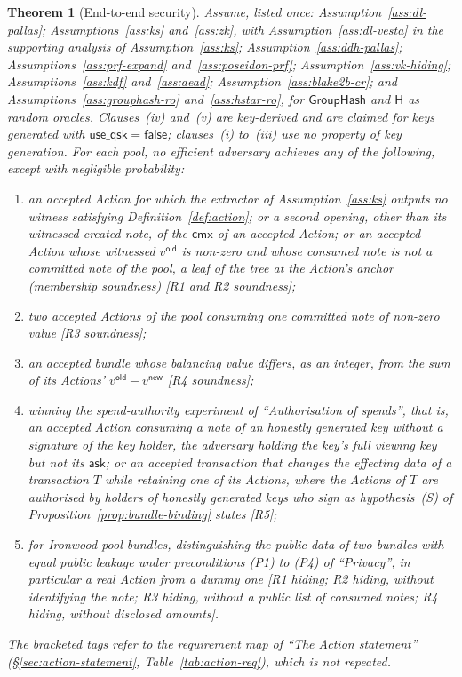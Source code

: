 \documentclass[11pt,a4paper]{article}
\newtheorem{theorem}{Theorem}[section]
\theoremstyle{definition}
\newcommand{\cmx}{\mathsf{cmx}}
\newcommand{\GroupHash}{\ensuremath{\mathsf{GroupHash}}}
\newcommand{\ask}{\ensuremath{\mathsf{ask}}}
\begin{document}
\begin{theorem}[End-to-end security]\label{thm:e2e}
Assume, listed once: Assumption~\ref{ass:dl-pallas};
Assumptions~\ref{ass:ks} and~\ref{ass:zk}, with
Assumption~\ref{ass:dl-vesta} in the supporting analysis of
Assumption~\ref{ass:ks}; Assumption~\ref{ass:ddh-pallas};
Assumptions~\ref{ass:prf-expand} and~\ref{ass:poseidon-prf};
Assumption~\ref{ass:vk-hiding}; Assumptions~\ref{ass:kdf}
and~\ref{ass:aead}; Assumption~\ref{ass:blake2b-cr}; and
Assumptions~\ref{ass:grouphash-ro} and~\ref{ass:hstar-ro}, for $\GroupHash$
and $\mathsf{H}$ as random oracles. Clauses~(iv) and~(v) are key-derived and
are claimed for keys generated with $\mathsf{use\_qsk} = \mathsf{false}$;
clauses~(i) to~(iii) use no property of key generation. For each pool, no
efficient adversary achieves any of the following, except with negligible
probability:
\begin{enumerate}
\item[(i)] an accepted Action for which the extractor of
  Assumption~\ref{ass:ks} outputs no witness satisfying
  Definition~\ref{def:action}; or a second opening, other than its
  witnessed created note, of the $\cmx$ of an accepted Action; or an
  accepted Action whose witnessed $v^{\mathsf{old}}$ is non-zero and whose
  consumed note is not a committed note of the pool, a leaf of the tree at
  the Action's anchor (membership soundness) [R1 and R2 soundness];
\item[(ii)] two accepted Actions of the pool consuming one committed note of
  non-zero value [R3 soundness];
\item[(iii)] an accepted bundle whose balancing value differs, as an
  integer, from the sum of its Actions' $v^{\mathsf{old}} -
  v^{\mathsf{new}}$ [R4 soundness];
\item[(iv)] winning the spend-authority experiment of ``Authorisation of
  spends'', that is, an accepted Action consuming a note of an honestly
  generated key without a signature of the key holder, the adversary holding
  the key's full viewing key but not its $\ask$; or an accepted transaction
  that changes the effecting data of a transaction $T$ while retaining one of
  its Actions, where the Actions of $T$ are authorised by holders of honestly
  generated keys who sign as hypothesis~(S) of
  Proposition~\ref{prop:bundle-binding} states [R5];
\item[(v)] for Ironwood-pool bundles, distinguishing the public data of two
  bundles with equal public leakage under preconditions (P1) to (P4) of
  ``Privacy'', in particular a real Action from a dummy one [R1 hiding; R2
  hiding, without identifying the note; R3 hiding, without a public list of
  consumed notes; R4 hiding, without disclosed amounts].
\end{enumerate}
The bracketed tags refer to the requirement map of ``The Action statement''
(\S\ref{sec:action-statement}, Table~\ref{tab:action-req}), which is not
repeated.
\end{theorem}
\end{document}
